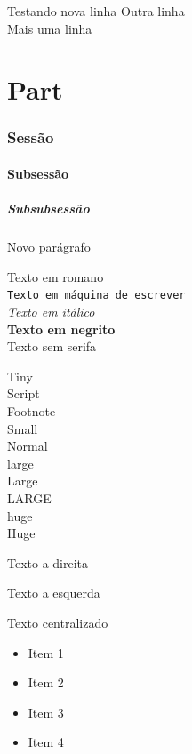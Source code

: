 


Testando nova linha \newline
Outra linha \\
Mais uma linha\\

\part{Part}
\section{Sessão}
\subsection{Subsessão}
\subsubsection{Subsubsessão}
\par Novo parágrafo

\textrm{Texto em romano} \\
\texttt{Texto em máquina de escrever} \\
\textit{Texto em itálico} \\
\textbf{Texto em negrito} \\
\textsf{Texto sem serifa} 

\tiny{Tiny} \\
\scriptsize{Script} \\
\footnotesize{Footnote} \\
\small{Small} \\
\normalsize{Normal} \\
\large{large} \\
\Large{Large} \\
\LARGE{LARGE} \\
\huge{huge} \\
\Huge{Huge} \\
\normalsize

\begin{flushright}
    Texto a direita
\end{flushright}

\begin{flushleft}
    Texto a esquerda
\end{flushleft}

\begin{center}
    Texto centralizado
\end{center}
\begin{itemize}
    \item Item 1
    \item Item 2
    \item Item 3
    \item Item 4
\end{itemize}

